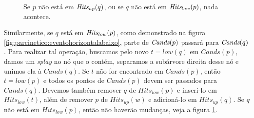 \begin{figure}[h]
    \caption{Se $p$ não está em $\textit{Hits}_{up}(q)$, ou se
    $q$ não está em $\textit{Hits}_{low}(p)$, nada acontece.}
    \label{fig:parcinetico:eventohorizontalabaixosemmudancas}
\end{figure}
Similarmente, se $q$ está em $\textit{Hits}_{low}(p)$, como demonstrado na
figura \ref{fig:parcinetico:eventohorizontalabaixo}, parte de
$\textit{Cands}(p)$ passará para $\textit{Cands}(q)$. Para realizar tal operação,
buscamos pelo novo $t = low(q)$ em $Cands(p)$, damos um
\textit{splay} no nó que o contém, separamos a subárvore direita
desse nó e unimos ela à $Cands(q)$. Se $t$ não for encontrado em
$Cands(p)$, então $t = low(p)$ e todos os pontos de $Cands(p)$ devem
ser passados para $Cands(q)$. Devemos também remover $q$ de
$Hits_{low}(p)$ e inseri-lo em $Hits_{low}(t)$, além de remover $p$
de $Hits_{up}(w)$ e adicioná-lo em $Hits_{up}(q)$. Se $q$ não está
em $Hits_{low}(p)$, então não haverão mudanças, veja a figura
\ref{fig:parcinetico:eventohorizontalabaixosemmudancas}.

